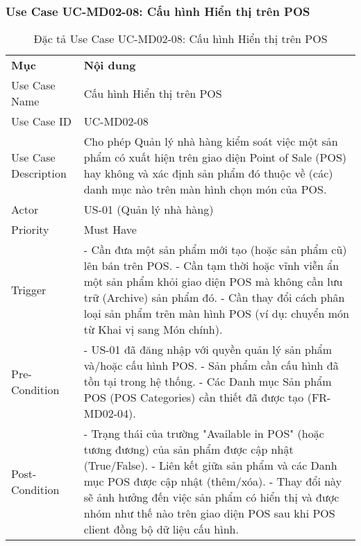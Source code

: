 \subsubsection{Use Case UC-MD02-08: Cấu hình Hiển thị trên POS}
\begin{longtable}{|m{4cm}|p{11cm}|}
\caption{Đặc tả Use Case UC-MD02-08: Cấu hình Hiển thị trên POS} \label{tab:uc_md02_08} \\
\hline

\endhead %

\hline
\endfoot %

\hline
\endlastfoot %
\multicolumn{2}{|c|}{\textbf{2.1. Tóm tắt (Summary)}} \\
\hline
\textbf{Mục} & \textbf{Nội dung} \\
\hline
Use Case Name & Cấu hình Hiển thị trên POS \\
\hline
Use Case ID & UC-MD02-08 \\
\hline
Use Case Description & Cho phép Quản lý nhà hàng kiểm soát việc một sản phẩm có xuất hiện trên giao diện Point of Sale (POS) hay không và xác định sản phẩm đó thuộc về (các) danh mục nào trên màn hình chọn món của POS. \\
\hline
Actor & US-01 (Quản lý nhà hàng) \\
\hline
Priority & Must Have \\
\hline
Trigger & - Cần đưa một sản phẩm mới tạo (hoặc sản phẩm cũ) lên bán trên POS. \newline - Cần tạm thời hoặc vĩnh viễn ẩn một sản phẩm khỏi giao diện POS mà không cần lưu trữ (Archive) sản phẩm đó. \newline - Cần thay đổi cách phân loại sản phẩm trên màn hình POS (ví dụ: chuyển món từ Khai vị sang Món chính). \\
\hline
Pre-Condition & - US-01 đã đăng nhập với quyền quản lý sản phẩm và/hoặc cấu hình POS. \newline - Sản phẩm cần cấu hình đã tồn tại trong hệ thống. \newline - Các Danh mục Sản phẩm POS (POS Categories) cần thiết đã được tạo (FR-MD02-04). \\
\hline
Post-Condition & - Trạng thái của trường "Available in POS" (hoặc tương đương) của sản phẩm được cập nhật (True/False). \newline - Liên kết giữa sản phẩm và các Danh mục POS được cập nhật (thêm/xóa). \newline - Thay đổi này sẽ ảnh hưởng đến việc sản phẩm có hiển thị và được nhóm như thế nào trên giao diện POS sau khi POS client đồng bộ dữ liệu cấu hình. \\

\end{longtable}
